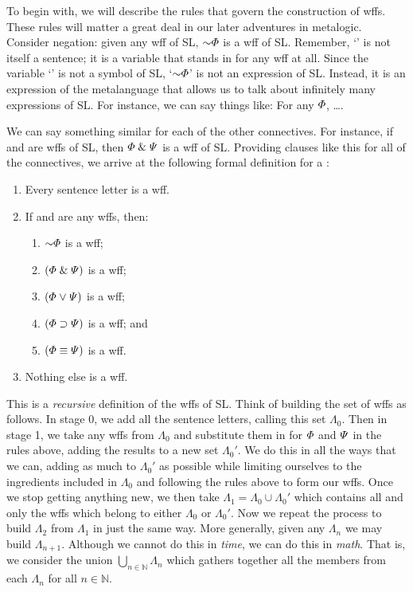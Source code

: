 To begin with, we will describe the rules that govern the construction of wffs.
These rules will matter a great deal in our later adventures in metalogic.
Consider negation: given any wff \metaA{} of SL, $\enot\metaA{}$ is a wff of SL.
Remember, `\metaA{}' is not itself a sentence; it is a variable that stands in for any wff at all.
Since the variable `\metaA{}' is not a symbol of SL, `$\enot\metaA{}$' is not an expression of SL.
Instead, it is an expression of the metalanguage that allows us to talk about infinitely many expressions of SL.
For instance, we can say things like: For any $\varPhi$, \ldots.

We can say something similar for each of the other connectives.
For instance, if \metaA{} and \metaB{} are wffs of SL, then $\varPhi{}\mathrel\&\varPsi{}$ is a wff of SL.
Providing clauses like this for all of the connectives, we arrive at the following formal definition for a :

\begin{enumerate}
\item Every sentence letter is a wff.
\item If \metaA{} and \metaB{} are any wffs, then:
	\begin{enumerate}
		\item $\enot\metaA{}$ is a wff;
		\item $(\varPhi{}\mathrel\&\varPsi{})$ is a wff;
		\item $(\varPhi{}\mkern1mu\vee\mkern1mu\varPsi{})$ is a wff;
		\item $(\varPhi{}\supset\varPsi{})$ is a wff; and
		\item $(\varPhi{}\equiv\varPsi{})$ is a wff.
	\end{enumerate}
\item Nothing else is a wff.
\end{enumerate}

This is a \emph{recursive} definition of the wffs of SL.
Think of building the set of wffs as follows.
In stage 0, we add all the sentence letters, calling this set $\Lambda_0$.
Then in stage 1, we take any wffs from $\Lambda_0$ and substitute them in for $\varPhi{}$ and $\varPsi{}$ in the rules above, adding the results to a new set $\Lambda_0'$.
We do this in all the ways that we can, adding as much to $\Lambda_0'$ as possible while limiting ourselves to the ingredients included in $\Lambda_0$ and following the rules above to form our wffs. 
Once we stop getting anything new, we then take $\Lambda_1 = \Lambda_0 \cup \Lambda_0'$ which contains all and only the wffs which belong to either $\Lambda_0$ or $\Lambda_0'$.
Now we repeat the process to build $\Lambda_2$ from $\Lambda_1$ in just the same way.
More generally, given any $\Lambda_n$ we may build $\Lambda_{n+1}$.
Although we cannot do this in \textit{time}, we can do this in \textit{math}.
That is, we consider the union $\bigcup_{n\in \mathbb{N}}\Lambda_n$ which gathers together all the members from each $\Lambda_n$ for all $n \in \mathbb{N}$.

